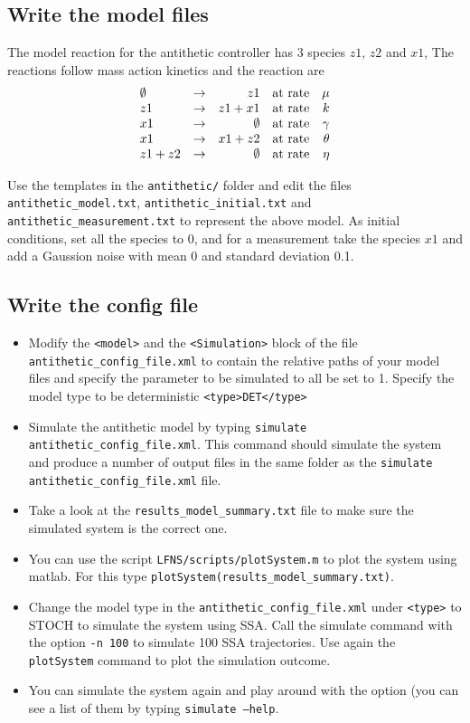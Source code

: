 \documentclass[11pt]{article} %
\begin{document}
\subsection{Write the model files}
The model reaction for the antithetic controller has 3 species $z1$, $z2$ and $x1$, The reactions follow mass action kinetics and the reaction are
$$
\begin{array}{l c r c r}
\emptyset & \rightarrow & z1 & \textnormal{at rate} & \mu\\
z1 & \rightarrow & z1 + x1& \textnormal{at rate} & k \\
x1 & \rightarrow & \emptyset & \textnormal{at rate} & \gamma\\
x1 & \rightarrow & x1 + z2 & \textnormal{at rate} & \theta\\
z1 + z2& \rightarrow & \emptyset & \textnormal{at rate} & \eta\\
\end{array}
$$

Use the templates in the \texttt{antithetic/} folder and edit the files \texttt{antithetic\_model.txt}, \texttt{antithetic\_initial.txt} and \texttt{antithetic\_measurement.txt} to represent the above model. As initial conditions, set all the species to 0, and for a measurement take the species $x1$ and add a Gaussion noise with mean $0$ and standard deviation 0.1.

\subsection{Write the config file}
\begin{itemize}
\item Modify the \texttt{<model>} and the \texttt{<Simulation>} block of the file \texttt{antithetic\_config\_file.xml} to contain the relative paths of your model files and specify the parameter to be simulated to all be set to 1. Specify the model type to be deterministic \texttt{<type>DET</type>}
\item Simulate the antithetic model by typing \texttt{simulate antithetic\_config\_file.xml}. This command should simulate the system and produce a number of output files in the same folder as the \texttt{simulate antithetic\_config\_file.xml} file.
\item Take a look at the \texttt{results\_model\_summary.txt} file to make sure the simulated system is the correct one. 
\item You can use the script \texttt{LFNS/scripts/plotSystem.m} to plot the system using matlab. For this type \texttt{plotSystem(results\_model\_summary.txt)}. 
\item Change the model type in the \texttt{antithetic\_config\_file.xml} under \texttt{<type>} to STOCH to simulate the system using SSA. Call the simulate command with the option \texttt{-n 100} to simulate 100 SSA trajectories. Use again the \texttt{plotSystem} command to plot the simulation outcome. 
\item You can simulate the system again and play around with the option (you can see a list of them by typing \texttt{simulate --help}. 
\end{itemize}
\end{document}
